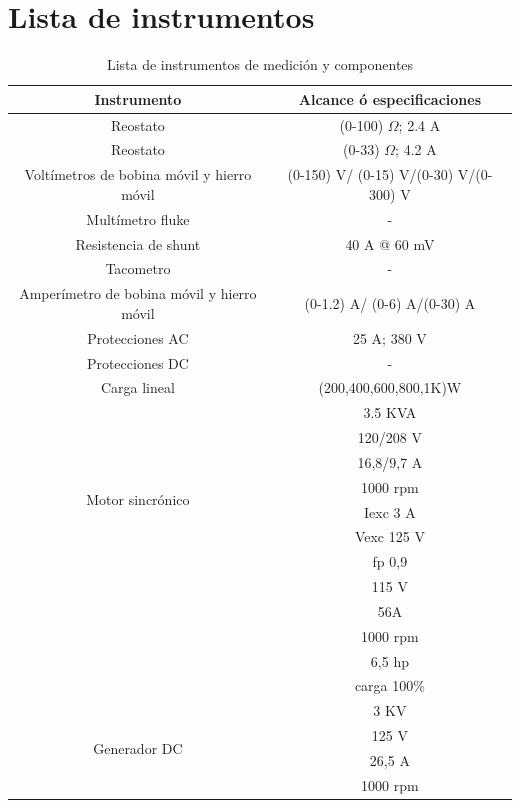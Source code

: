 \documentclass[11pt,letterpaper]{article}     %
\begin{document}
\section{Lista de instrumentos}
\begin{table}[H]
	\caption{Lista de instrumentos de medición y componentes}
	\centering
	\begin{tabular}{|c|c|}
		\hline 
		Instrumento & Alcance ó especificaciones \\ \hline 
		Reostato &  (0-100) $\Omega$; 2.4 A \\  
		\hline 
		Reostato &  (0-33) $\Omega$; 4.2 A \\  
		\hline
		Voltímetros de bobina móvil y hierro móvil &  (0-150) V/ (0-15) V/(0-30) V/(0-300) V\\  
		\hline 
			Multímetro fluke & -\\  
		\hline 
		Resistencia de shunt & 40 A @ 60 mV\\  
		\hline
		Tacometro & -\\  
		\hline
		Amperímetro de bobina móvil y hierro móvil &(0-1.2) A/ (0-6) A/(0-30) A \\ 
		\hline
		Protecciones AC & 25 A; 380 V\\ 
		\hline
		Protecciones DC & -\\ 
		\hline
		Carga lineal & (200,400,600,800,1K)W  \\
        \hline
        \multirow{8}{3cm}{Motor sincrónico} & 3.5 KVA \\ 
        \cline{2-2}
        & 120/208 V \\
        \cline{2-2}
        & 16,8/9,7 A\\
        \cline{2-2}
        &1000 rpm\\
        \cline{2-2}
        &Iexc 3 A\\
        \cline{2-2}
        &Vexc 125 V\\
        \cline{2-2}
        & fp 0,9
        \\ \hline
        \multirow{5}{3cm}{Motor DC} & 115 V \\ 
        \cline{2-2}
        & 56A  \\
        \cline{2-2}
        & 1000 rpm\\
        \cline{2-2}
        &6,5 hp\\
        \cline{2-2}
        &carga 100\%\\
        \hline
        \multirow{5}{3cm}{Generador DC} & 3 KV\\ 
        \cline{2-2}
        & 125 V \\
        \cline{2-2}
        &26,5 A\\
        \cline{2-2}
        & 1000 rpm\\
        \hline

        
	\end{tabular} 
\end{table}
\end{document}
